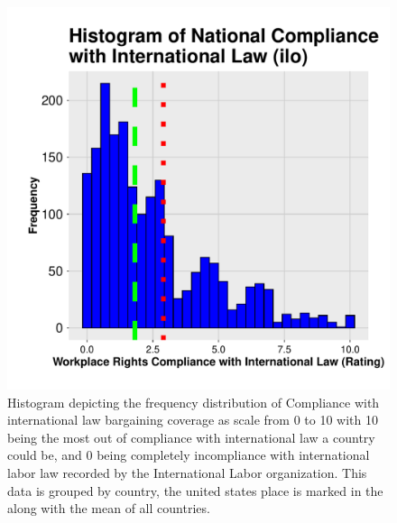 \documentclass[11pt]{article}\usepackage[]{graphicx}\usepackage[]{xcolor}
\newenvironment{knitrout}{}{} %
\begin{document}
\begin{figure}[h]
\centering
  \begin{minipage}{0.7\linewidth}
\begin{knitrout}
\color{fgcolor}

{\centering \includegraphics[width=0.7\linewidth]{figure/WorkplaceRights-1} 

}


\end{knitrout}
  \caption{Histogram depicting the frequency distribution of Compliance with international law bargaining coverage as scale from 0 to 10 with 10 being the most out of compliance with international law a country could be, and 0 being completely incompliance with international labor law recorded by the International Labor organization. This data is grouped by country, the united states place is marked in the along with the mean of all countries.}
  \label{fig:7}
  \end{minipage}
\end{figure}

\clearpage
\end{document}
